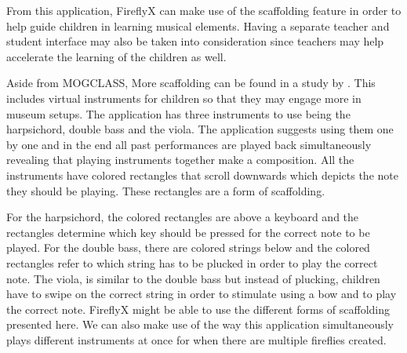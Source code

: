 From this application, FireflyX can make use of the scaffolding feature in order to help guide children in learning musical elements. Having a separate teacher and student interface may also be taken into consideration since teachers may help accelerate the learning of the children as well. 


Aside from MOGCLASS, More scaffolding can be found in a study by . This includes virtual instruments for children so that they may engage more in museum setups. The application has three instruments to use being the harpsichord, double bass and the viola. The application suggests using them one by one and in the end all past performances are played back simultaneously revealing that playing instruments together make a composition. All the instruments have colored rectangles that scroll downwards which depicts the note they should be playing. These rectangles are a form of scaffolding.

For the harpsichord, the colored rectangles are above a keyboard and the rectangles determine which key should be pressed for the correct note to be played. For the double bass, there are colored strings below and the colored rectangles refer to which string has to be plucked in order to play the correct note. The viola, is similar to the double bass but instead of plucking, children have to swipe on the correct string in order to stimulate using a bow and to play the correct note. FireflyX might be able to use the different forms of scaffolding presented here. We can also make use of the way this application simultaneously plays different instruments at once for when there are multiple fireflies created.



